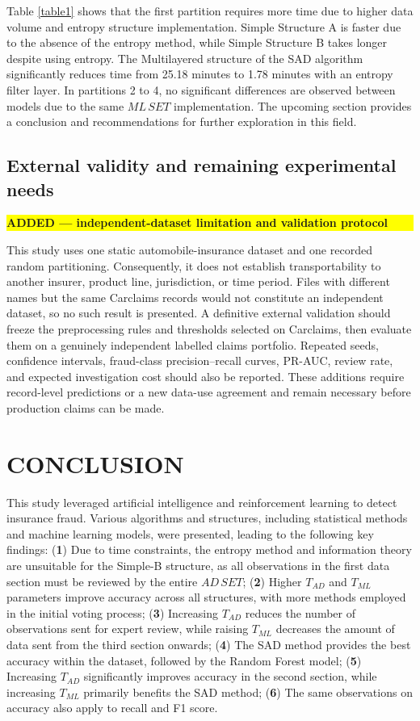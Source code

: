 \documentclass[12pt]{article}
\newcommand{\revmark}[1]{\par\noindent\colorbox{yellow}{%
  \parbox{\dimexpr\linewidth-2\fboxsep}{\raggedright\strut\textbf{#1}}}%
  \par\smallskip}
\begin{document}
Table \ref{table1} shows that the first partition requires more
time due to higher data volume and entropy structure
implementation. Simple Structure A is faster due to the absence of
the entropy method, while Simple Structure B takes longer despite
using entropy. The  Multilayered structure of the SAD algorithm significantly reduces time
from 25.18 minutes to 1.78 minutes with an entropy filter layer.
In partitions 2 to 4, no significant differences are observed
between models due to the same $ML\, SET$ implementation. The
upcoming section provides a conclusion and recommendations for
further exploration in this field.

\subsection*{External validity and remaining experimental needs}
\revmark{ADDED --- independent-dataset limitation and validation protocol}
This study uses one static automobile-insurance dataset and one recorded
random partitioning. Consequently, it does not establish transportability to
another insurer, product line, jurisdiction, or time period. Files with
different names but the same Carclaims records would not constitute an
independent dataset, so no such result is presented. A definitive external
validation should freeze the preprocessing rules and thresholds selected on
Carclaims, then evaluate them on a genuinely independent labelled claims
portfolio. Repeated seeds, confidence intervals, fraud-class precision--recall
curves, PR-AUC, review rate, and expected investigation cost should also be
reported. These additions require record-level predictions or a new data-use
agreement and remain necessary before production claims can be made.

\iffalse
\section{CONCLUSION}\label{SC:CONCLUSION}
This study leveraged artificial intelligence and reinforcement
learning to detect insurance fraud. Various algorithms and
structures, including statistical methods and machine learning
models, were presented, leading to the following key findings:
({\bf 1}) Due to time constraints, the entropy method and
information theory are unsuitable for the Simple-B structure, as
all observations in the first data section must be reviewed by the
entire $AD\, SET$; ({\bf 2}) Higher $T_{AD}$ and $T_{ML}$ parameters
improve accuracy across all structures, with more methods employed
in the initial voting process; ({\bf 3}) Increasing $T_{AD}$
reduces the number of observations sent for expert review, while
raising $T_{ML}$ decreases the amount of data sent from the third
section onwards; ({\bf 4}) The SAD method provides the best
accuracy within the dataset, followed by the Random Forest model;
({\bf 5}) Increasing $T_{AD}$ significantly improves accuracy in
the second section, while increasing $T_{ML}$ primarily benefits
the SAD method; ({\bf 6}) The same observations on accuracy also
apply to recall and F1 score.
\end{document}
